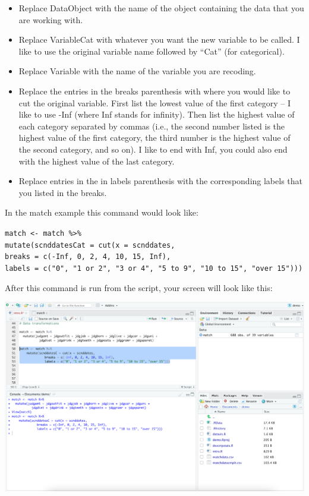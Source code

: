 \documentclass[
]{book}
\providecommand{\tightlist}{%
  \setlength{\itemsep}{0pt}\setlength{\parskip}{0pt}}
\begin{document}
\begin{itemize}
\tightlist
\item
  Replace DataObject with the name of the object containing the data that you are working with.\\
\item
  Replace VariableCat with whatever you want the new variable to be called. I like to use the original variable name followed by ``Cat'' (for categorical).\\
\item
  Replace Variable with the name of the variable you are recoding.\\
\item
  Replace the entries in the breaks parenthesis with where you would like to cut the original variable. First list the lowest value of the first category -- I like to use -Inf (where Inf stands for infinity). Then list the highest value of each category separated by commas (i.e., the second number listed is the highest value of the first category, the third number is the highest value of the second category, and so on). I like to end with Inf, you could also end with the highest value of the last category.\\
\item
  Replace entries in the in labels parenthesis with the corresponding labels that you listed in the breaks.
\end{itemize}

In the match example this command would look like:

\texttt{match\ \textless{}-\ match\ \%\textgreater{}\%}\\
\texttt{mutate(scnddatesCat\ =\ cut(x\ =\ scnddates,}~\\
\texttt{breaks\ =\ c(-Inf,\ 0,\ 2,\ 4,\ 10,\ 15,\ Inf),}~\\
\texttt{labels\ =\ c("0",\ "1\ or\ 2",\ "3\ or\ 4",\ "5\ to\ 9",\ "10\ to\ 15",\ "over\ 15")))}

After this command is run from the script, your screen will look like this:

\includegraphics{img/DATA THINGS R113.png}
\end{document}

